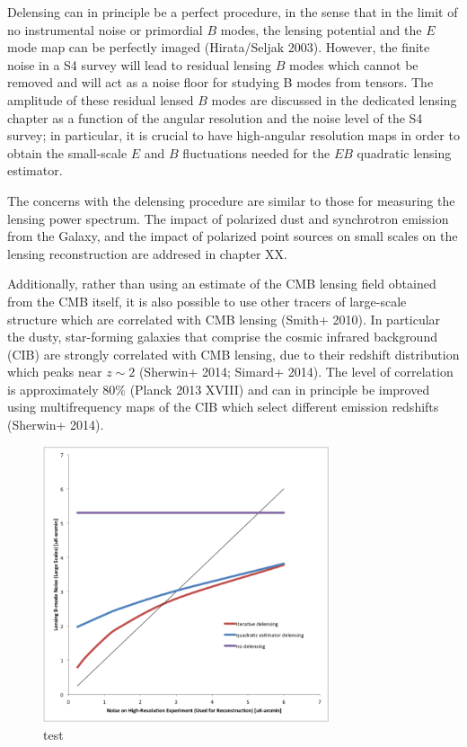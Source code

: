 Delensing can in principle be a perfect procedure, in the sense that in the limit of no instrumental noise or primordial $B$ modes, the lensing potential and the $E$ mode map can be perfectly imaged (Hirata/Seljak 2003).  However, the finite noise in a S4 survey will lead to residual lensing $B$ modes which cannot be removed and will act as a noise floor for studying B modes from tensors.  The amplitude of these residual lensed $B$ modes are discussed in the dedicated lensing chapter as a function of the angular resolution and the noise level of the S4 survey; in particular, it is crucial to have high-angular resolution maps in order to obtain the small-scale $E$ and $B$ fluctuations needed for the $EB$ quadratic lensing estimator.

The concerns with the delensing procedure are similar to those for measuring the lensing power spectrum. The impact of polarized dust and synchrotron emission from the Galaxy, and the impact of polarized point sources on small scales on the lensing reconstruction are addresed in chapter XX.

Additionally, rather than using an estimate of the CMB lensing field obtained from the CMB itself, it is also possible to use other tracers of large-scale structure which are correlated with  CMB lensing (Smith+ 2010).  In particular the dusty, star-forming galaxies that comprise the cosmic infrared background (CIB) are strongly correlated with CMB lensing, due to their redshift distribution which peaks near $z \sim 2$ (Sherwin+ 2014; Simard+ 2014).  The level of correlation is approximately $80\%$ (Planck 2013 XVIII) and can in principle be improved using multifrequency maps of the CIB which select different emission redshifts (Sherwin+ 2014). 

\begin{figure}[h]
\includegraphics[width=0.75\textwidth]{CMBLensing/delensingIterative.png}
\caption{test}
\end{figure}



